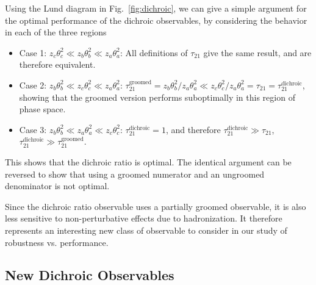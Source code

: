 \documentclass[11pt,letterpaper]{article}
\newcommand{\dichroic}{\text{dichroic}}
\newcommand{\groomed}{\text{groomed}}
\DeclareRobustCommand{\Fig}[1]{Fig.~\ref{#1}}
\begin{document}
Using the Lund diagram in \Fig{fig:dichroic}, we can give a simple argument for the optimal performance of the dichroic observables, by considering the behavior in each of the three regions
\begin{itemize}
\item Case 1: $z_c \theta_c^2 \ll z_b \theta_b^2 \ll z_a \theta_a^2$: All definitions of $\tau_{21}$ give the same result, and are therefore equivalent.
\item Case 2: $z_b\theta_b^2 \ll z_c \theta_c^2 \ll z_a \theta_a^2$: $\tau_{21}^\groomed=z_b \theta_b^2/z_a \theta_a^2 \ll  z_c \theta_c^2/z_a \theta_a^2=\tau_{21}=\tau_{21}^\dichroic$, showing that the groomed version performs suboptimally in this region of phase space.
\item Case 3: $z_b \theta_b^2 \ll z_a \theta_a^2 \ll z_c \theta_c^2$: $\tau_{21}^\dichroic=1$, and therefore $\tau_{21}^\dichroic \gg \tau_{21}$, $\tau_{21}^\dichroic \gg \tau_{21}^\groomed$. 
\end{itemize}
This shows that the dichroic ratio is optimal. The identical argument can be reversed to show that using a groomed numerator and an ungroomed denominator is not optimal.

Since the dichroic ratio observable uses a partially groomed observable, it is also less sensitive to non-perturbative effects due to hadronization. It therefore represents an interesting new class of observable to consider in our study of robustness vs. performance. 







\subsection{New Dichroic Observables}\label{sec:dichroic_new}
\end{document}

